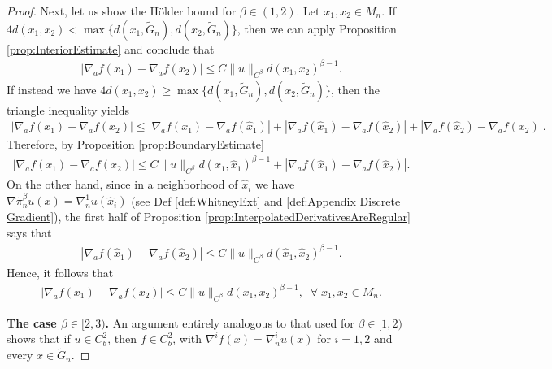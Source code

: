 \documentclass[11pt,reqno]{amsart}
\numberwithin{equation}{section}
\theoremstyle{plain}
\def\grad{\nabla}
\begin{document}
\begin{proof}
  Next, let us show the H\"older bound for $\beta \in (1,2)$. Let $x_1,x_2\in M_n$. If $4d(x_1,x_2) < \max\{d(x_1,\tilde G_n),d(x_2,\tilde G_n)\}$, then we can apply Proposition \ref{prop:InteriorEstimate} and conclude that
  \begin{align*}
    |\nabla_af(x_1)-\nabla_af(x_2)| \leq C\|u\|_{C^\beta}d(x_1,x_2)^{\beta-1}.
  \end{align*}
  If instead we have $4d(x_1,x_2)\geq \max \{d(x_1,\tilde G_n),d(x_2,\tilde G_n)\}$, then the triangle inequality yields
  \begin{align*}
    |\nabla_af(x_1) -\nabla_af(x_2)| \leq |\nabla_af(x_1) -\nabla_af(\hat x_1)|+|\nabla_af(\hat x_1) -\nabla_af(\hat x_2)|+|\nabla_af(\hat x_2) -\nabla_af(x_2)|.
  \end{align*}
  Therefore, by Proposition \ref{prop:BoundaryEstimate}
  \begin{align*}
    |\nabla_af(x_1) -\nabla_af(x_2)| \leq C\|u\|_{C^\beta}d(x_1,\hat x_1)^{\beta-1}+|\nabla_af(\hat x_1) -\nabla_af(\hat x_2)|.
  \end{align*}
  On the other hand, since in a neighborhood of $\hat x_i$ we have $\grad \tilde \pi_n^\beta u(x)=\nabla^1_n u(\hat x_i)$ (see Def \ref{def:WhitneyExt} and \ref{def:Appendix Discrete Gradient}), the first half of Proposition \ref{prop:InterpolatedDerivativesAreRegular} says that
  \begin{align*}
    |\nabla_af(\hat x_1) -\nabla_af(\hat x_2)|\leq C\|u\|_{C^\beta}d(\hat x_1,\hat x_2)^{\beta-1}.
  \end{align*}
  Hence, it follows that
  \begin{align*}
    |\nabla_af(x_1) -\nabla_af(x_2)| \leq C\|u\|_{C^\beta}d(x_1,x_2)^{\beta-1},\;\;\forall\;x_1,x_2\in M_{n}.
  \end{align*}
  
  \textbf{The case $\beta \in [2,3)$.} An argument entirely analogous to that used for $\beta \in [1,2)$ shows that if $u\in C^2_b$, then $f\in C^2_b$, with $\nabla^i f(x) = \nabla^i_n u(x)$ for $i=1,2$ and every $x\in \tilde G_n$.
  

\end{proof}
\end{document}
